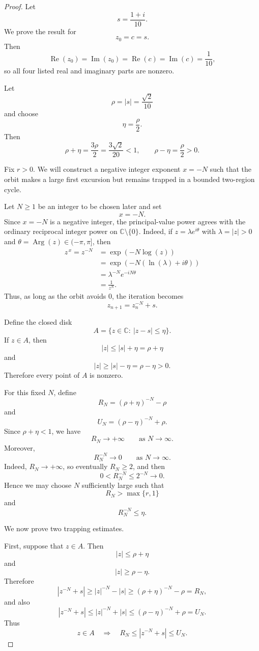 \documentclass[12pt,a4paper]{amsart}
\theoremstyle{remark}
\newcommand{\C}{\mathbb{C}}
\begin{document}
\begin{proof}
Let
\[
s=\frac{1+i}{10}.
\]
We prove the result for
\[
z_0=c=s.
\]
Then
\[
\operatorname{Re}(z_0)=\operatorname{Im}(z_0)
=
\operatorname{Re}(c)=\operatorname{Im}(c)
=
\frac{1}{10},
\]
so all four listed real and imaginary parts are nonzero.

Let
\[
\rho=|s|=\frac{\sqrt{2}}{10}
\]
and choose
\[
\eta=\frac{\rho}{2}.
\]
Then
\[
\rho+\eta=\frac{3\rho}{2}=\frac{3\sqrt{2}}{20}<1,
\qquad
\rho-\eta=\frac{\rho}{2}>0.
\]

Fix $r>0$. We will construct a negative integer exponent $x=-N$ such that
the orbit makes a large first excursion but remains trapped in a bounded
two-region cycle.

Let $N\ge 1$ be an integer to be chosen later and set
\[
x=-N.
\]
Since $x=-N$ is a negative integer, the principal-value power agrees with
the ordinary reciprocal integer power on $\C\setminus\{0\}$. Indeed, if
$z=\lambda e^{i\theta}$ with $\lambda=|z|>0$ and
$\theta=\operatorname{Arg}(z)\in(-\pi,\pi]$, then
\[
\begin{aligned}
z^{\,x}=z^{-N}
&=\exp(-N\log(z)) \\
&=\exp(-N(\ln(\lambda)+i\theta)) \\
&=\lambda^{-N}e^{-iN\theta} \\
&=\frac{1}{z^N}.
\end{aligned}
\]
Thus, as long as the orbit avoids $0$, the iteration becomes
\[
z_{n+1}=z_n^{-N}+s.
\]

Define the closed disk
\[
A=\{z\in\C:\ |z-s|\le \eta\}.
\]
If $z\in A$, then
\[
|z|\le |s|+\eta=\rho+\eta
\]
and
\[
|z|\ge |s|-\eta=\rho-\eta>0.
\]
Therefore every point of $A$ is nonzero.

For this fixed $N$, define
\[
R_N=(\rho+\eta)^{-N}-\rho
\]
and
\[
U_N=(\rho-\eta)^{-N}+\rho.
\]
Since $\rho+\eta<1$, we have
\[
R_N\to+\infty
\qquad\text{as }N\to\infty.
\]
Moreover,
\[
R_N^{-N}\to 0
\qquad\text{as }N\to\infty.
\]
Indeed, $R_N\to+\infty$, so eventually $R_N\ge 2$, and then
\[
0<R_N^{-N}\le 2^{-N}\to0.
\]
Hence we may choose $N$ sufficiently large such that
\[
R_N>\max\{r,1\}
\]
and
\[
R_N^{-N}\le \eta.
\]

We now prove two trapping estimates.

First, suppose that $z\in A$. Then
\[
|z|\le \rho+\eta
\]
and
\[
|z|\ge \rho-\eta.
\]
Therefore
\[
|z^{-N}+s|
\ge
|z|^{-N}-|s|
\ge
(\rho+\eta)^{-N}-\rho
=
R_N,
\]
and also
\[
|z^{-N}+s|
\le
|z|^{-N}+|s|
\le
(\rho-\eta)^{-N}+\rho
=
U_N.
\]
Thus
\[
z\in A
\quad\Longrightarrow\quad
R_N\le |z^{-N}+s|\le U_N.
\]


\end{proof}
\end{document}
